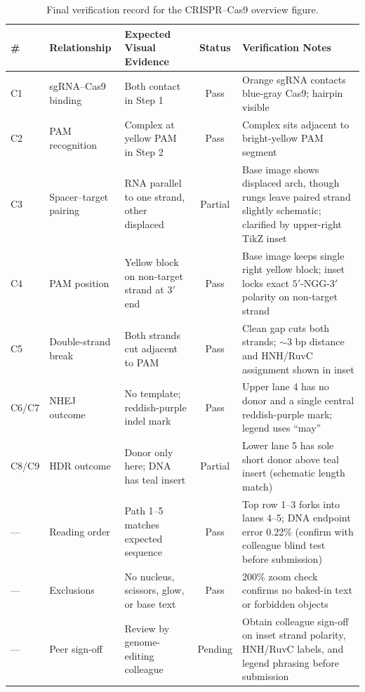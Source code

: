 \begin{table}[htbp]\centering\footnotesize
\setlength{\tabcolsep}{3pt}
\renewcommand{\arraystretch}{1.15}
\caption{Final verification record for the CRISPR--Cas9 overview figure.}\label{tab:ch03-04-verify}
\begin{tabularx}{\linewidth}{@{}l>{\raggedright\arraybackslash}p{22mm}>{\raggedright\arraybackslash}p{32mm}cY@{}}
\toprule
\textbf{\#} & \textbf{Relationship} & \textbf{Expected Visual Evidence} & \textbf{Status} & \textbf{Verification Notes} \\
\midrule
C1 & sgRNA--Cas9 binding & Both contact in Step 1 & Pass & Orange sgRNA contacts blue-gray Cas9; hairpin visible \\
C2 & PAM recognition & Complex at yellow PAM in Step 2 & Pass & Complex sits adjacent to bright-yellow PAM segment \\
C3 & Spacer--target pairing & RNA parallel to one strand, other displaced & Partial & Base image shows displaced arch, though rungs leave paired strand slightly schematic; clarified by upper-right TikZ inset \\
C4 & PAM position & Yellow block on non-target strand at $3'$ end & Pass & Base image keeps single right yellow block; inset locks exact $5'$-NGG-$3'$ polarity on non-target strand \\
C5 & Double-strand break & Both strands cut adjacent to PAM & Pass & Clean gap cuts both strands; $\sim$3 bp distance and HNH/RuvC assignment shown in inset \\
C6/C7 & NHEJ outcome & No template; reddish-purple indel mark & Pass & Upper lane 4 has no donor and a single central reddish-purple mark; legend uses ``may'' \\
C8/C9 & HDR outcome & Donor only here; DNA has teal insert & Partial & Lower lane 5 has sole short donor above teal insert (schematic length match) \\
--- & Reading order & Path 1--5 matches expected sequence & Pass & Top row 1--3 forks into lanes 4--5; DNA endpoint error 0.22\% (confirm with colleague blind test before submission) \\
--- & Exclusions & No nucleus, scissors, glow, or base text & Pass & 200\% zoom check confirms no baked-in text or forbidden objects \\
--- & Peer sign-off & Review by genome-editing colleague & Pending & Obtain colleague sign-off on inset strand polarity, HNH/RuvC labels, and legend phrasing before submission \\
\bottomrule
\end{tabularx}
\end{table}

